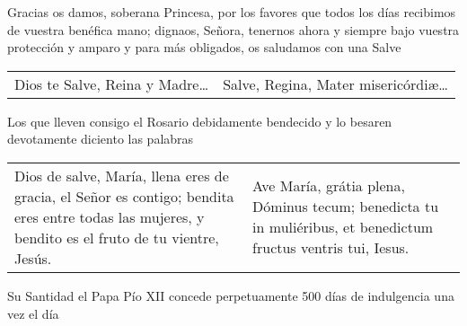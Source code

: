 \documentclass[../devocionario.tex]{subfiles}
\begin{document}
    \bigskip

    Gracias os damos, soberana Princesa, por los favores que todos los días recibimos de vuestra benéfica mano; dignaos, Señora, tenernos ahora 
    y siempre bajo vuestra protección y amparo y para más obligados, os saludamos con una Salve
    
    \bigskip

    \begin{tabular} { p{} p{} }
        Dios te Salve, Reina y Madre{\ldots} & Salve, Regina, Mater mi­se­ri­córdiæ{\ldots}
    \end{tabular}

    \bigskip

    Los que lleven consigo el Rosario debidamente bendecido y lo besaren devotamente diciento las palabras

    \bigskip

    \begin{tabular} { p{} p{} }
        Dios de salve, María, llena eres de gracia, el Señor es contigo; bendita eres entre todas las mujeres, 
        y bendito es el fruto de tu vientre, Jesús. & 
        Ave María, grátia plena, Dóminus tecum; benedicta tu in muliéribus, et benedictum fructus ventris tui, Iesus.
    \end{tabular}

    \bigskip

    Su Santidad el Papa Pío XII concede perpetuamente 500 días de indulgencia una vez el día
\end{document}
